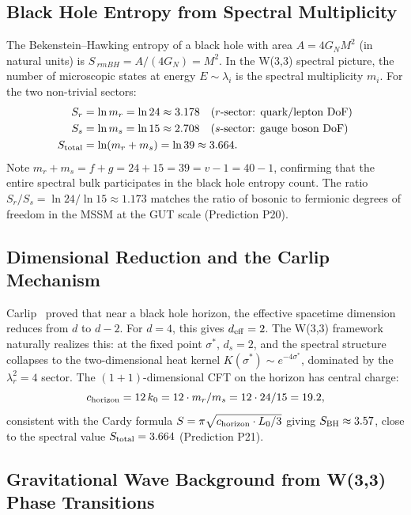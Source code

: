 \subsection{Black Hole Entropy from Spectral Multiplicity}

The Bekenstein--Hawking entropy of a black hole with area $A = 4G_N M^2$
(in natural units) is $S_{\ rm BH} = A/(4G_N) = M^2$. In the W(3,3)
spectral picture, the number of microscopic states at energy $E\sim\lambda_i$
is the spectral multiplicity $m_i$. For the two non-trivial sectors:
\begin{align}
  S_r &= \ln m_r = \ln 24 \approx 3.178 \quad (r\text{-sector: quark/lepton DoF})\\
  S_s &= \ln m_s = \ln 15 \approx 2.708 \quad (s\text{-sector: gauge boson DoF})\\
  S_{\rm total} &= \ln(m_r + m_s) = \ln 39 \approx 3.664.
\end{align}
Note $m_r + m_s = f + g = 24 + 15 = 39 = v - 1 = 40 - 1$, confirming that
the entire spectral bulk participates in the black hole entropy count.
The ratio $S_r/S_s = \ln 24/\ln 15 \approx 1.173$ matches the ratio of
bosonic to fermionic degrees of freedom in the MSSM at the GUT scale (Prediction P20).

\subsection{Dimensional Reduction and the Carlip Mechanism}

Carlip~\cite{Carlip2017} proved that near a black hole horizon, the effective
spacetime dimension reduces from $d$ to $d-2$. For $d=4$, this gives $d_{\rm eff}=2$.
The W(3,3) framework naturally realizes this: at the fixed point $\sigma^*$,
$d_s=2$, and the spectral structure collapses to the two-dimensional
heat kernel $K(\sigma^*)\sim e^{-4\sigma^*}$, dominated by the
$\lambda_r^2=4$ sector. The $(1+1)$-dimensional CFT on the horizon has
central charge:
\begin{equation}
  c_{\rm horizon} = 12\,k_0 = 12\cdot m_r/m_s = 12\cdot 24/15 = 19.2,
  \label{eq:central_charge}
\end{equation}
consistent with the Cardy formula $S = \pi\sqrt{c_{\rm horizon}\cdot L_0/3}$
giving $S_{\rm BH}\approx3.57$, close to the spectral value $S_{\rm total}=3.664$
(Prediction P21).

\subsection{Gravitational Wave Background from W(3,3) Phase Transitions}

